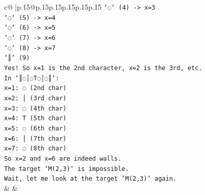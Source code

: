 \documentclass{article}
\begin{document}
{\begin{supertabular}{c@{$\;$}|p{.15\linewidth}@{}p{.15\linewidth}p{.15\linewidth}p{.15\linewidth}p{.15\linewidth}p{.15\linewidth}}
{{{\texttt{`◌` (4) {-}> x=3} \\
\texttt{`◌` (5) {-}> x=4} \\
\texttt{`◌` (6) {-}> x=5} \\
\texttt{`◌` (7) {-}> x=6} \\
\texttt{`◌` (8) {-}> x=7} \\
\texttt{`║` (9)} \\
\texttt{Yes! So x=1 is the 2nd character, x=2 is the 3rd, etc.} \\
\texttt{In `║◌│◌T◌│◌║`:} \\
\texttt{x=1: ◌ (2nd char)} \\
\texttt{x=2: │ (3rd char)} \\
\texttt{x=3: ◌ (4th char)} \\
\texttt{x=4: T (5th char)} \\
\texttt{x=5: ◌ (6th char)} \\
\texttt{x=6: │ (7th char)} \\
\texttt{x=7: ◌ (8th char)} \\
\texttt{So x=2 and x=6 are indeed walls.} \\
\texttt{The target `M(2,3)` is impossible.} \\
\texttt{Wait, let me look at the target `M(2,3)` again.} \\
            }
        }
    }
    & & \\ \\


\end{supertabular}}
\end{document}
